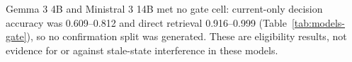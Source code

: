 Gemma 3 4B and Ministral 3 14B met no gate cell: current-only decision accuracy was 0.609--0.812 and direct
retrieval 0.916--0.999 (Table~\ref{tab:models-gate}), so no confirmation split was generated. These are
eligibility results, not evidence for or against stale-state interference in these models.
